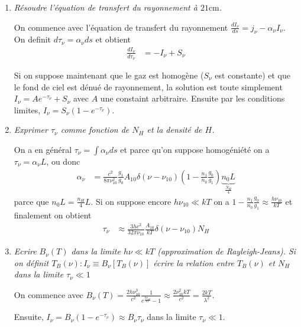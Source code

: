 \documentclass[10pt]{report}
\newcommand{\rd}[2]{\frac{d#1}{d#2}}
\begin{document}
\begin{enumerate}[1.]
    \item \emph{R\'esoudre l'\'equation de transfert du rayonnement \`a $21\mathrm{cm}$.}

        On commence avec l'\'equation de transfert du rayonnement $\rd{I_\nu}{s} = j_\nu - \alpha_\nu I_\nu$. On definit $d\tau_\nu = \alpha_\nu ds$ et obtient
        \begin{align}
            \rd{I_\nu}{\tau_\nu} &= -I_\nu + S_\nu
        \end{align}

        Si on suppose maintenant que le gaz est homog\`ene ($S_\nu$ est constante) et que le fond de ciel est d\'enu\'e de rayonnement, la solution est toute simplement $I_\nu = Ae^{-\tau_\nu} + S_\nu$ avec $A$ une constaint arbitraire. Ensuite par les conditions limites, $I_\nu = S_\nu\left( 1 - e^{-\tau_\nu} \right)$.

    \item \emph{Exprimer $\tau_\nu$ comme fonction de $N_H$ et la densit\'e de $H$.}

        On a en g\'en\'eral $\tau_\nu = \int \alpha_\nu ds$ et parce qu'on suppose homog\'eni\'et\'e on a $\tau_\nu = \alpha_\nu L$, ou donc
        \begin{align}
            \alpha_\nu &= \frac{c^2}{8\pi \nu_{10}^2} \frac{g_1}{g_0}A_{10}\delta\left( \nu - \nu_{10} \right)\left( 1 - \frac{n_1}{n_0}\frac{g_0}{g_1} \right) \underbrace{n_0L}_{\frac{N_{H}}{4}}
        \end{align}
        parce que $n_0L = \frac{n_H}{4}L$. Si on suppose encore $h\nu_{10} \ll kT$ on a $1 - \frac{n_1}{n_0}\frac{g_0}{g_1} \approx \frac{h\nu_{10}}{kT}$ et finalement on obtient
        \begin{align}
            \tau_\nu &\approx \frac{3hc^2}{32\pi \nu_{10}}\frac{A_{10}}{kT} \delta(\nu - \nu_{10}) N_{H}
        \end{align}

    \item \emph{Ecrire $B_\nu(T)$ dans la limite $h\nu \ll kT$ (approximation de Rayleigh-Jeans). Si on d\'efinit $T_B(\nu): I_\nu \equiv B_\nu\left[ T_B(\nu) \right]$ \'ecrire la relation entre $T_B(\nu)$ et $N_H$ dans la limite $\tau_\nu \ll 1$}

        On commence avec $B_\nu(T) = \frac{2h\nu_{10}^3}{c^2}\frac{1}{e^{\frac{h\nu_{10}}{kT}} - 1} \approx \frac{2\nu_{10}^2kT}{c^2} = \frac{2kT}{\lambda^2}$.

        Ensuite, $I_\nu  = B_\nu \left( 1 - e^{-\tau_\nu} \right) \approx B_\nu \tau_\nu$ dans la limite $\tau_\nu \ll 1$. 
\end{enumerate}
\end{document}
